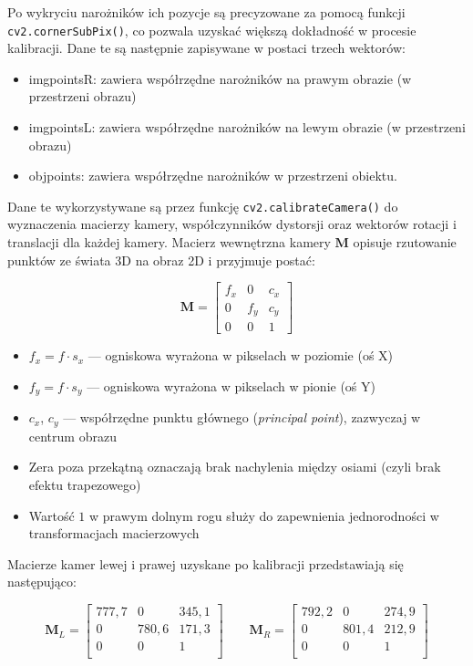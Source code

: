 \documentclass[magisterska]{pracadypl}
\begin{document}
Po wykryciu narożników ich pozycje są precyzowane za pomocą funkcji \texttt{cv2.cornerSubPix()}, co pozwala uzyskać większą dokładność w procesie kalibracji. Dane te są następnie zapisywane w postaci trzech wektorów:

\begin{itemize}
  \item imgpointsR: zawiera współrzędne narożników na prawym obrazie (w przestrzeni obrazu)
  \item imgpointsL: zawiera współrzędne narożników na lewym obrazie (w przestrzeni obrazu)
  \item objpoints: zawiera współrzędne narożników w przestrzeni obiektu.
\end{itemize}

Dane te wykorzystywane są przez funkcję \texttt{cv2.calibrateCamera()} do wyznaczenia macierzy kamery, współczynników dystorsji oraz wektorów rotacji i translacji dla każdej kamery. Macierz wewnętrzna kamery $\mathbf{M}$ opisuje rzutowanie punktów ze świata 3D na obraz 2D i przyjmuje postać:

\[
\mathbf{M} =
\begin{bmatrix}
f_x & 0 & c_x \\
0 & f_y & c_y \\
0 & 0 & 1
\end{bmatrix}
\]

\begin{itemize}
  \item $f_x = f \cdot s_x$ — ogniskowa wyrażona w pikselach w poziomie (oś X)
  \item $f_y = f \cdot s_y$ — ogniskowa wyrażona w pikselach w pionie (oś Y)
  \item $c_x$, $c_y$ — współrzędne punktu głównego (\textit{principal point}), zazwyczaj w centrum obrazu
  \item Zera poza przekątną oznaczają brak nachylenia między osiami (czyli brak efektu trapezowego)
  \item Wartość $1$ w prawym dolnym rogu służy do zapewnienia jednorodności w transformacjach macierzowych
\end{itemize}

Macierze kamer lewej i prawej uzyskane po kalibracji przedstawiają się następująco:

\[
\mathbf{M}_L =
\begin{bmatrix}
777,7 & 0 & 345,1 \\
0 & 780,6 & 171,3 \\
0 & 0 & 1 \\
\end{bmatrix}
\qquad
\mathbf{M}_R =
\begin{bmatrix}
792,2 & 0 & 274,9 \\
0 & 801,4 & 212,9 \\
0 & 0 & 1 \\
\end{bmatrix}
\]
\end{document}
